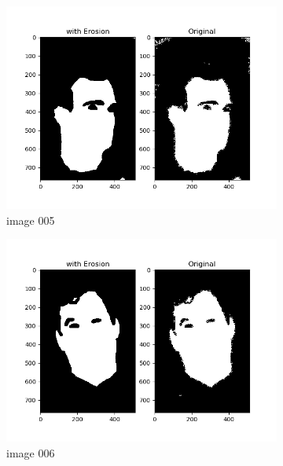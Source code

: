 \documentclass[11pt]{report}
\begin{document}
\begin{figure}[H]
\begin{subfigure}{0.3\textwidth}
        \centering
        \includegraphics[width=\textwidth]{Task 2 Plots/bin_mask_erode_005.png}
        \caption{image 005}
        \label{fig:binmask_erode5}
    \end{subfigure}
    \begin{subfigure}{0.3\textwidth}
        \centering
        \includegraphics[width=\textwidth]{Task 2 Plots/bin_mask_erode_006.png}
        \caption{image 006}
        \label{fig:binmask_erode6}
    \end{subfigure}
    \begin{subfigure}{0.3\textwidth}
        \centering

\end{subfigure}
\end{figure}
\end{document}

